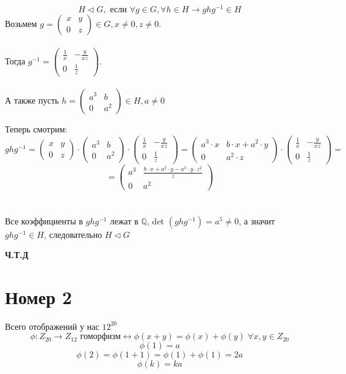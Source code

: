 \documentclass[a4paper,12pt]{article}
\begin{document}
\[
H \triangleleft G, \text{ если }\forall g \in G, \forall h \in H \rightarrow ghg^{-1} \in H 
\]
Возьмем $g = \begin{pmatrix}
x & y \\ 0 & z
\end{pmatrix} \in G, x \neq 0, z \neq 0$.
\\\\
Тогда $g^{-1} = \begin{pmatrix}
\frac{1}{x} & -\frac{y}{xz} \\ 0 & \frac{1}{z}
\end{pmatrix}$. 
\\\\ 
А также пусть $h = \begin{pmatrix}
a^3 & b \\ 0 & a^2
\end{pmatrix} \in H, a \neq 0 $

Теперь смотрим:
\[
ghg^{-1} = \begin{pmatrix}
x & y \\ 0 & z
\end{pmatrix} \cdot \begin{pmatrix}
a^3 & b \\ 0 & a^2
\end{pmatrix} \cdot \begin{pmatrix}
\frac{1}{x} & -\frac{y}{xz} \\ 0 & \frac{1}{z}
\end{pmatrix} = \left(\begin{matrix}
a^3 \cdot x & b \cdot x+a^2 \cdot y \\
0 & a^2 \cdot z
\end{matrix}\right) \cdot \begin{pmatrix}
\frac{1}{x} & -\frac{y}{xz} \\ 0 & \frac{1}{z}
\end{pmatrix}
=
\]
\[
=
\left(\begin{matrix}
a^3 & \frac{b \cdot x+a^2 \cdot y-a^3 \cdot y \cdot z^2}{z} \\
0 & a^2
\end{matrix}\right)
\]
\\\\
Все коэффициенты в $ghg^{-1}$ лежат в $\mathbb{Q}$, det $\left(ghg^{-1}\right) = a^5 \neq 0$, а значит $ghg^{-1} \in H$, следовательно $H \triangleleft G$
\begin{center}
\textbf{Ч.Т.Д}
\end{center}

\clearpage
\section*{Номер 2}
Всего отображений у нас $12^{20}$
\[
\phi : Z_{20} \rightarrow Z_{12} \text{ гоморфизм} \leftrightarrow \phi(x+y) = \phi(x) + \phi(y) \; \forall x, y \in Z_{20}
\]
\[
\phi(1) = a
\]
\[
\phi(2) = \phi(1 + 1) = \phi(1) + \phi(1) = 2a
\]
\[
\phi(k) = ka
\]
\end{document}
